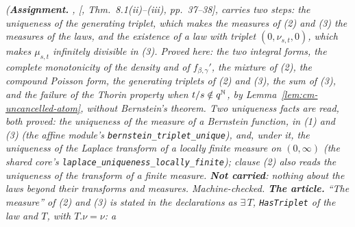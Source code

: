 \begin{proposition}[the increments]
\statusA\quad{}\quad\emph{(\textbf{Assignment.} ,
[, Thm.~8.1(ii)--(iii), pp.~37--38], carries two steps: the uniqueness of the
generating triplet, which makes the measures of (2) and (3) \emph{the} \Levy{} measures of the
laws, and the existence of a law with triplet $(0, \nu_{s,t}, 0)$, which makes $\mu_{s,t}$
infinitely divisible in (3). Proved here: the two integral forms, the complete monotonicity of the
density and of $f_{\beta,\gamma}'$, the mixture of (2), the compound Poisson form, the generating
triplets of (2) and (3), the sum of (3), and the failure of the Thorin property when
$t/s \notin q^{\mathbb{N}}$, by Lemma~\ref{lem:cm-uncancelled-atom}, without Bernstein's theorem. Two
uniqueness facts are read, both proved: the uniqueness of the \Levy{} measure of a Bernstein
function, in (1) and (3) (the affine module's \texttt{bernstein\_triplet\_unique}), and, under it,
the uniqueness of the Laplace transform of a locally finite measure on $(0, \infty)$ (the shared
core's \texttt{laplace\_uniqueness\_locally\_finite}); clause (2) also reads the uniqueness of the
transform of a finite measure.
\textbf{Not carried}: nothing about the laws beyond their transforms and \Levy{} measures.
Machine-checked. \textbf{The article.} ``The \Levy{} measure'' of (2) and (3) is stated in the
declarations as $\exists\,T$, \texttt{HasTriplet} of the law and $T$, with $T.\nu = \nu$: a \Levy{}
}
\end{proposition}
